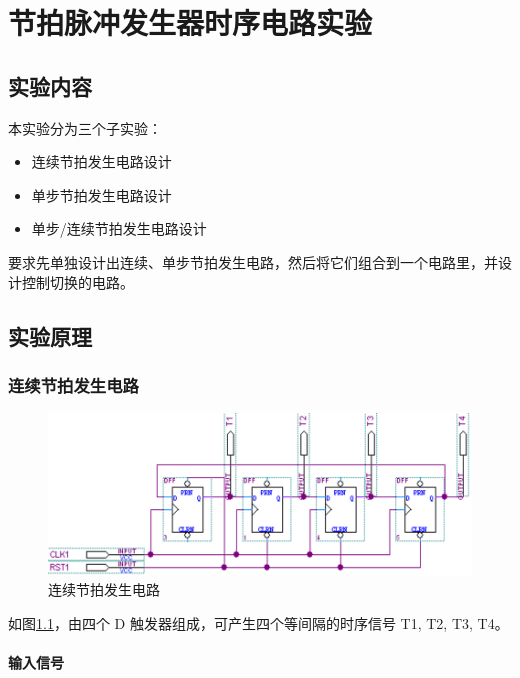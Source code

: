 \chapter{节拍脉冲发生器时序电路实验}

\section{实验内容}

本实验分为三个子实验：

\begin{itemize}
    \item 连续节拍发生电路设计
    \item 单步节拍发生电路设计
    \item 单步/连续节拍发生电路设计
\end{itemize}

要求先单独设计出连续、单步节拍发生电路，然后将它们组合到一个电路里，并设计控制切换的电路。

\section{实验原理}

\subsection{连续节拍发生电路}

\begin{figure}[H]
\centering
\includegraphics[width=\textwidth]{images/prin1_1.png}
\caption{连续节拍发生电路}
\label{fig:prin1_1}
\end{figure}

如图\ref{fig:prin1_1}，由四个 D 触发器组成，可产生四个等间隔的时序信号 T1, T2, T3, T4。

\subsubsection{输入信号}

